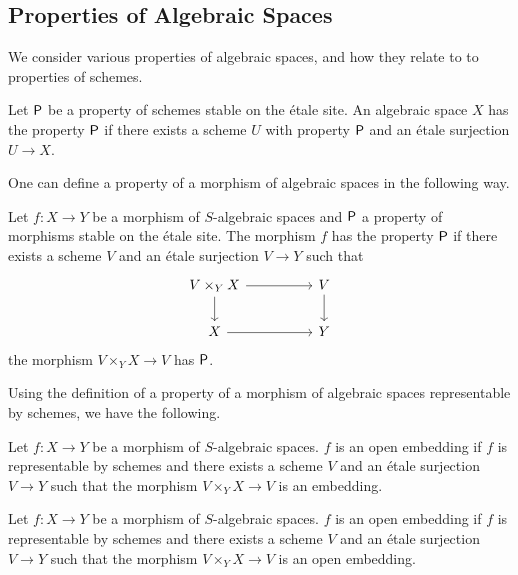 \subsection{Properties of Algebraic Spaces}
We consider various properties of algebraic spaces, and how they relate to to properties of schemes. 
\begin{definition}\label{def: property of algebraic space}
    Let $\mathsf{P}$ be a property of schemes stable on the \'{e}tale site. An algebraic space $X$ has the property $\mathsf{P}$ if there exists a scheme $U$ with property $\mathsf{P}$ and an \'{e}tale surjection $U\to X$.
\end{definition}
One can define a property of a morphism of algebraic spaces in the following way. 
\begin{definition}\label{def: property of morphisms of spaces}
    Let $f:X\to Y$ be a morphism of $S$-algebraic spaces and $\mathsf{P}$ a property of morphisms stable on the \'{e}tale site. The morphism $f$ has the property $\mathsf{P}$ if there exists a scheme $V$ and an \'{e}tale surjection $V\to Y$ such that 
    $$%
    \begin{tikzcd}
        {V\times_{Y}X} && V \\
        X && Y
        \arrow[from=1-3, to=2-3]
        \arrow[from=2-1, to=2-3]
        \arrow[from=1-1, to=1-3]
        \arrow[from=1-1, to=2-1]
    \end{tikzcd}$$
    the morphism $V\times_{Y}X\to V$ has $\mathsf{P}$. 
\end{definition}
Using the definition of a property of a morphism of algebraic spaces representable by schemes, we have the following. 
\begin{definition}\label{def: embedding of algebraic spaces}
    Let $f:X\to Y$ be a morphism of $S$-algebraic spaces. $f$ is an open embedding if $f$ is representable by schemes and there exists a scheme $V$ and an \'{e}tale surjection $V\to Y$ such that the morphism $V\times_{Y}X\to V$ is an embedding. 
\end{definition}
\begin{definition}\label{def: open embedding of algebraic spaces}
    Let $f:X\to Y$ be a morphism of $S$-algebraic spaces. $f$ is an open embedding if $f$ is representable by schemes and there exists a scheme $V$ and an \'{e}tale surjection $V\to Y$ such that the morphism $V\times_{Y}X\to V$ is an open embedding. 
\end{definition}
